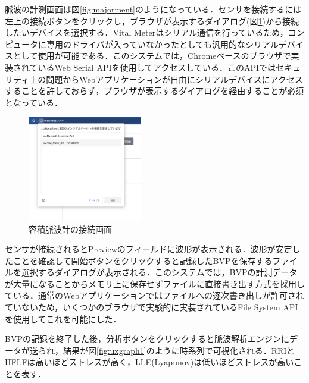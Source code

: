 脈波の計測画面は図\ref{fig:majorment}のようになっている．センサを接続するには左上の接続ボタンをクリックし，ブラウザが表示するダイアログ(図\ref{fig:connectconfirm})から接続したいデバイスを選択する．Vital Meterはシリアル通信を行っているため，コンピュータに専用のドライバが入っていなかったとしても汎用的なシリアルデバイスとして使用が可能である．このシステムでは，Chromeベースのブラウザで実装されているWeb Serial API\cite{webserialapi}を使用してアクセスしている．このAPIではセキュリティ上の問題からWebアプリケーションが自由にシリアルデバイスにアクセスすることを許しておらず，ブラウザが表示するダイアログを経由することが必須となっている．

\begin{figure}[htbp]
  \begin{minipage}{\hsize}
    \begin{center}
       \includegraphics[width=50mm]{img/connectconfirm.png}
    \end{center}
    \caption{容積脈波計の接続画面}
    \label{fig:connectconfirm}
  \end{minipage}
\end{figure}

センサが接続されるとPreviewのフィールドに波形が表示される．波形が安定したことを確認して開始ボタンをクリックすると記録したBVPを保存するファイルを選択するダイアログが表示される．このシステムでは，BVPの計測データが大量になることからメモリ上に保存せずファイルに直接書き出す方式を採用している．通常のWebアプリケーションではファイルへの逐次書き出しが許可されていないため，いくつかのブラウザで実験的に実装されているFile System API\cite{filesystemapi}を使用してこれを可能にした．

BVPの記録を終了した後，分析ボタンをクリックすると脈波解析エンジンにデータが送られ，結果が図\ref{fig:uxgraph1}のように時系列で可視化される．RRIとHFLFは高いほどストレスが高く，LLE(Lyapunov)は低いほどストレスが高いことを表す．

